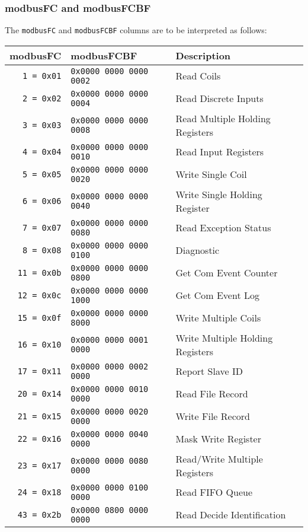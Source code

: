 \documentclass[documentation]{subfiles}
\begin{document}
\subsubsection{modbusFC and modbusFCBF}\label{modbusFC}
The {\tt modbusFC} and {\tt modbusFCBF} columns are to be interpreted as follows:
\begin{longtable}{rll}
    \toprule
    {\bf modbusFC} & {\bf modbusFCBF} & {\bf Description}\\
    \midrule\endhead%
    {\tt  1 = 0x01} & {\tt 0x0000 0000 0000 0002} & Read Coils\\
    {\tt  2 = 0x02} & {\tt 0x0000 0000 0000 0004} & Read Discrete Inputs\\
    {\tt  3 = 0x03} & {\tt 0x0000 0000 0000 0008} & Read Multiple Holding Registers\\
    {\tt  4 = 0x04} & {\tt 0x0000 0000 0000 0010} & Read Input Registers\\
    {\tt  5 = 0x05} & {\tt 0x0000 0000 0000 0020} & Write Single Coil\\
    {\tt  6 = 0x06} & {\tt 0x0000 0000 0000 0040} & Write Single Holding Register\\
    {\tt  7 = 0x07} & {\tt 0x0000 0000 0000 0080} & Read Exception Status\\
    {\tt  8 = 0x08} & {\tt 0x0000 0000 0000 0100} & Diagnostic\\
    {\tt 11 = 0x0b} & {\tt 0x0000 0000 0000 0800} & Get Com Event Counter\\
    {\tt 12 = 0x0c} & {\tt 0x0000 0000 0000 1000} & Get Com Event Log\\
    {\tt 15 = 0x0f} & {\tt 0x0000 0000 0000 8000} & Write Multiple Coils\\
    {\tt 16 = 0x10} & {\tt 0x0000 0000 0001 0000} & Write Multiple Holding Registers\\
    {\tt 17 = 0x11} & {\tt 0x0000 0000 0002 0000} & Report Slave ID\\
    {\tt 20 = 0x14} & {\tt 0x0000 0000 0010 0000} & Read File Record\\
    {\tt 21 = 0x15} & {\tt 0x0000 0000 0020 0000} & Write File Record\\
    {\tt 22 = 0x16} & {\tt 0x0000 0000 0040 0000} & Mask Write Register\\
    {\tt 23 = 0x17} & {\tt 0x0000 0000 0080 0000} & Read/Write Multiple Registers\\
    {\tt 24 = 0x18} & {\tt 0x0000 0000 0100 0000} & Read FIFO Queue\\
    {\tt 43 = 0x2b} & {\tt 0x0000 0800 0000 0000} & Read Decide Identification\\
    \bottomrule
\end{longtable}
\end{document}
